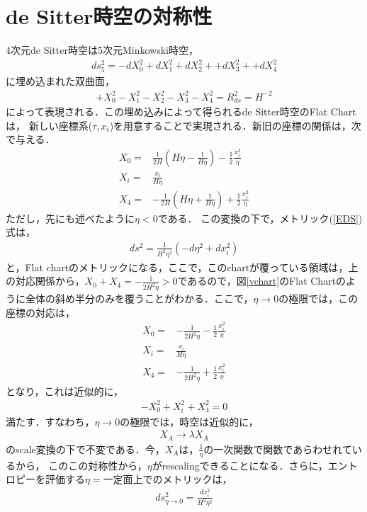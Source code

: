 \section{de Sitter時空の対称性}
4次元de Sitter時空は5次元Minkowski時空，
\begin{align}
  \label{EDS}
  ds^2_{5}=-dX_0^2+dX^2_{1}+dX^2_{2}++dX^2_{3}++dX^2_{4}
\end{align}
に埋め込まれた双曲面，
\begin{align}
  +X_0^2-X_1^2-X_2^2-X_3^2-X_4^2=R_{ds}^2=H^{-2}
\end{align}
によって表現される．この埋め込みによって得られるde Sitter時空のFlat Chartは，
新しい座標系($\tau,x_{i}$)を用意することで実現される．新旧の座標の関係は，次で与える．
\begin{align}
  X_{0}=&\frac{1}{2H}(H\eta-\frac{1}{H\eta})-\frac{1}{2}\frac{x_i^2}{\eta}\\
  X_{i}=&\frac{x_i}{H\eta}\\
  X_{4}=&-\frac{1}{2H}(H\eta+\frac{1}{H\eta})+\frac{1}{2}\frac{x_i^2}{\eta}
\end{align}
ただし，先にも述べたように$\eta<0$である．
この変換の下で，メトリック(\ref{EDS})式は，
\begin{align}
  ds^{2}=\frac{1}{H^2\eta^2}(-d\eta^2+dx_{i}^2)
\end{align}
と，Flat chartのメトリックになる，ここで，このchartが覆っている領域は，上の対応関係から，$X_{0}+X_{4}=-\frac{1}{2H^2\eta}>0$であるので，図\ref{vchart}のFlat Chartのように全体の斜め半分のみを覆うことがわかる．ここで，$\eta\to 0$の極限では，この座標の対応は，
\begin{align}
  X_{0}=&-\frac{1}{2H^2\eta}-\frac{1}{2}\frac{x_i^2}{\eta}\\
  X_{i}=&\frac{x_i}{H\eta}\\
  X_{4}=&-\frac{1}{2H^2\eta}+\frac{1}{2}\frac{x_i^2}{\eta}
\end{align}
となり，これは近似的に，
\begin{align}
  -X_{0}^2+X_{i}^2+X_{4}^2=0
\end{align}
満たす．すなわち，$\eta\to0$の極限では，時空は近似的に，
\begin{align}
  X_{A}\to\lambda X_{A}
\end{align}
のscale変換の下で不変である．今，$X_{A}$は，$\frac{1}{\eta}$の一次関数で関数であらわせれているから，
このこの対称性から，$\eta$がrescalingできることになる．さらに，エントロピーを評価する$\eta=$一定面上でのメトリックは，
\begin{align}
  ds^2_{\eta\to0}=\frac{dx^2_{i}}{H^2\eta^2}
\end{align}
